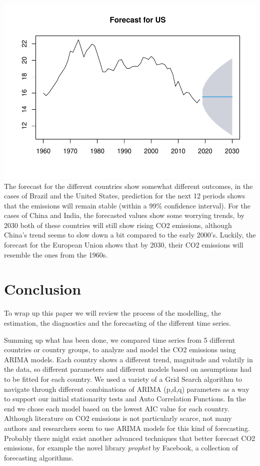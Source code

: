 \documentclass[
]{article}
\begin{document}
\includegraphics[width=0.5\linewidth]{tsa_files/figure-latex/forecast-5}
The forecast for the different countries show somewhat different
outcomes, in the cases of Brazil and the United States, prediction for
the next 12 periods shows that the emissions will remain stable (within
a 99\% confidence interval). For the cases of China and India, the
forecasted values show some worrying trends, by 2030 both of these
countries will still show rising CO2 emissions, although China's trend
seems to slow down a bit compared to the early 2000's. Luckily, the
forecast for the European Union shows that by 2030, their CO2 emissions
will resemble the ones from the 1960s.

\newpage

\hypertarget{conclusion}{%
\section{Conclusion}\label{conclusion}}

To wrap up this paper we will review the process of the modelling, the
estimation, the diagnostics and the forecasting of the different time
series.

Summing up what has been done, we compared time series from 5 different
countries or country groups, to analyze and model the CO2 emissions
using ARIMA models. Each country shows a different trend, magnitude and
volatily in the data, so different parameters and different models based
on assumptions had to be fitted for each country. We used a variety of a
Grid Search algorithm to navigate through different combinations of
ARIMA (p,d,q) parameters as a way to support our initial stationarity
tests and Auto Correlation Functions. In the end we chose each model
based on the lowest AIC value for each country. Although literature on
CO2 emissions is not particularly scarce, not many authors and
researchers seem to use ARIMA models for this kind of forecasting.
Probably there might exist another advanced techniques that better
forecast CO2 emissions, for example the novel library \emph{prophet} by
Facebook, a collection of forecasting algorithms.
\end{document}
